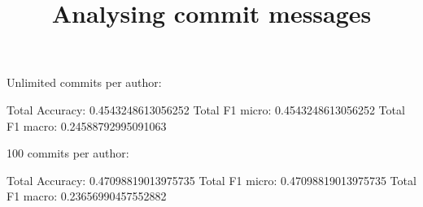 \documentclass{article}
\title{Analysing commit messages}
\begin{document}
  \maketitle

  
  
  
  

  Unlimited commits per author:

  Total Accuracy: 0.4543248613056252
  Total F1 micro: 0.4543248613056252
  Total F1 macro: 0.24588792995091063

  100 commits per author:

  Total Accuracy: 0.47098819013975735
  Total F1 micro: 0.47098819013975735
  Total F1 macro: 0.23656990457552882
\end{document}
